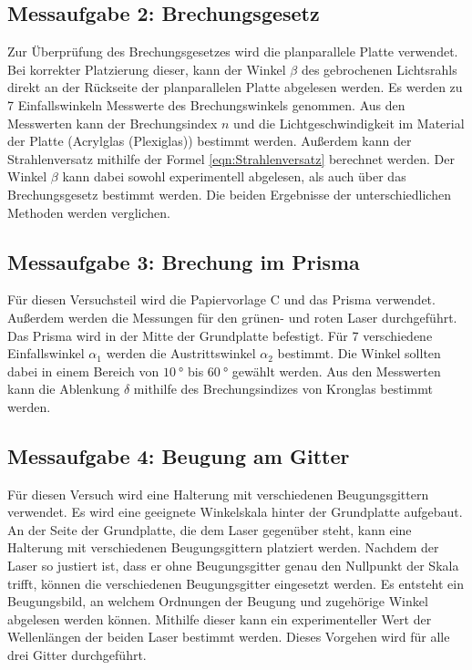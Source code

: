 \subsection{Messaufgabe 2: Brechungsgesetz}
\label{subsec:D_Brechung}
Zur Überprüfung des Brechungsgesetzes wird die planparallele Platte verwendet. Bei korrekter Platzierung dieser, kann der Winkel $\beta$ des gebrochenen Lichtsrahls direkt an
der Rückseite
der planparallelen Platte abgelesen werden. Es werden zu 7 Einfallswinkeln Messwerte des Brechungswinkels genommen. Aus den Messwerten kann der Brechungsindex $n$ und die
Lichtgeschwindigkeit im Material der Platte (Acrylglas (Plexiglas)) bestimmt werden. Außerdem kann der Strahlenversatz mithilfe der Formel \autoref{eqn:Strahlenversatz} berechnet werden.
Der Winkel $\beta$ kann dabei sowohl experimentell abgelesen, als auch über das Brechungsgesetz bestimmt werden. Die beiden Ergebnisse der unterschiedlichen Methoden werden 
verglichen.

\subsection{Messaufgabe 3: Brechung im Prisma}
\label{subsec:D_Prisma}
Für diesen Versuchsteil wird die Papiervorlage C und das Prisma verwendet. Außerdem werden die Messungen für den grünen- und roten Laser durchgeführt.
Das Prisma wird in der Mitte der Grundplatte befestigt. Für 7 verschiedene Einfallswinkel $\alpha_1$ werden die Austrittswinkel $\alpha_2$ bestimmt. Die Winkel
sollten dabei in einem Bereich von $\qty{10}{\degree}$ bis $\qty{60}{\degree}$ gewählt werden. Aus den Messwerten kann die Ablenkung $\delta$ mithilfe des Brechungsindizes 
von Kronglas bestimmt werden.

\subsection{Messaufgabe 4: Beugung am Gitter}
\label{subsec:D_Beugung}
Für diesen Versuch wird eine Halterung mit verschiedenen Beugungsgittern verwendet. Es wird eine geeignete Winkelskala hinter der Grundplatte aufgebaut. An der Seite der
Grundplatte, die dem Laser gegenüber steht, kann eine Halterung mit verschiedenen Beugungsgittern platziert werden. Nachdem der Laser so justiert ist, dass er ohne Beugungsgitter
genau den Nullpunkt der Skala trifft, können die verschiedenen Beugungsgitter eingesetzt werden.
Es entsteht ein Beugungsbild, an welchem Ordnungen der Beugung und zugehörige Winkel abgelesen werden können. Mithilfe dieser kann ein experimenteller Wert 
der Wellenlängen der beiden Laser bestimmt werden. Dieses Vorgehen wird für alle drei Gitter durchgeführt.

